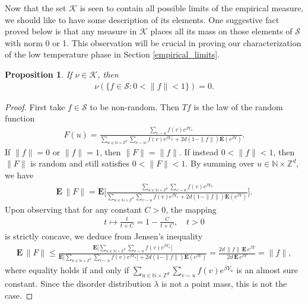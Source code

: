 \documentclass[11pt,reqno]{amsart}
\numberwithin{equation}{section}
\newtheorem{prop}[thm]{Proposition}
\theoremstyle{definition}
\begin{document}
Now that the set ${\mathcal{K}}$ is seen to contain all possible limits of the empirical measure, we should like to have some description of its elements.
One suggestive fact proved below is that any measure in ${\mathcal{K}}$ places all its mass on those elements of ${\mathcal{S}}$ with norm 0 or 1.
This observation will be crucial in proving our characterization of the low temperature phase in Section \ref{empirical_limits}.

\begin{prop} \label{no_middle}
If $\nu \in {\mathcal{K}}$, then
{\begin{align*} {
\nu(\{f \in {\mathcal{S}} : 0 < \|f\| < 1\}) = 0.
} \end{align*}}
\end{prop}

\begin{proof}
First take $f \in {\mathcal{S}}$ to be non-random.
Then $Tf$ is the law of the random function
{\begin{align*} {
F(u) = \frac{\sum_{v \sim u} f(v) e^{\beta Y_u}}{\sum_{w \in {\mathbb{N}} \times {\mathbb{Z}}^d} \sum_{v \sim w} f(v) e^{\beta Y_w} + 2d(1 - \|f\|){\mathbf{E}}(e^{\beta Y})}.
} \end{align*}}
If $\|f\| = 0$ or $\|f\| = 1$, then $\|F\| = \|f\|$.
If instead $0 < \|f\| < 1$, then $\|F\|$ is random and still satisfies $0 < \|F\| < 1$.
By summing over $u \in {\mathbb{N}} \times {\mathbb{Z}}^d$, we have
{\begin{align*} {
{\mathbf{E}}\, \|F\| = {\mathbf{E}}\Bigg[\frac{\sum_{u \in {\mathbb{N}} \times {\mathbb{Z}}^d} \sum_{v \sim u} f(v) e^{\beta Y_u}}{\sum_{u \in {\mathbb{N}} \times {\mathbb{Z}}^d} \sum_{v \sim u} f(v) e^{\beta Y_u} + 2d(1-\|f\|){\mathbf{E}}(e^{\beta Y})}\Bigg].
} \end{align*}}
Upon observing that for any constant $C > 0$, the mapping
{\begin{align*} {
t \mapsto \frac{t}{t+C} = 1 - \frac{C}{t+C}, \quad t > 0
} \end{align*}}
is strictly concave, we deduce from Jensen's inequality
{\begin{align*} {
{\mathbf{E}}\, \|F\| \leq \frac{{\mathbf{E}} \Big[\sum_{u \in {\mathbb{N}} \times {\mathbb{Z}}^d} \sum_{v \sim u} f(v) e^{\beta Y_u}\Big]}{{\mathbf{E}}\Big[\sum_{u \in {\mathbb{N}} \times {\mathbb{Z}}^d} \sum_{v \sim u} f(v) e^{\beta Y_u}\Big] + 2d(1-\|f\|){\mathbf{E}}(e^{\beta Y})} = \frac{2d\, \|f\|\, {\mathbf{E}}\, e^{\beta Y}}{2d\, {\mathbf{E}}\, e^{\beta Y}} = \|f\|,
} \end{align*}}
where equality holds if and only if $\sum_{u \in {\mathbb{N}} \times {\mathbb{Z}}^d} \sum_{v \sim u} f(v) e^{\beta Y_u}$ is an almost sure constant.
Since the disorder distribution $\lambda$ is not a point mass, this is not the case.


\end{proof}
\end{document}
